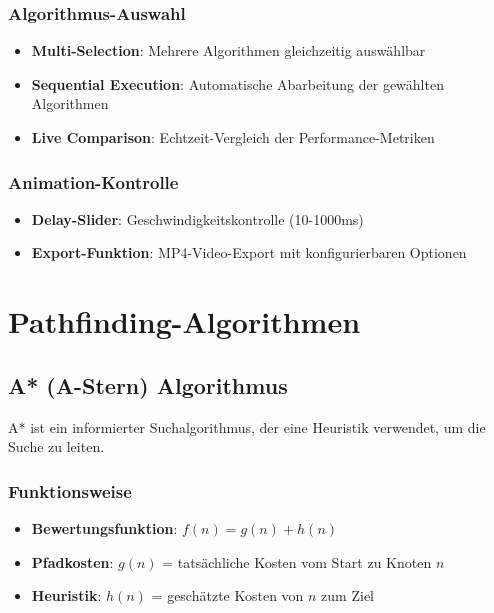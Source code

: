 \documentclass[12pt,a4paper]{article}
\begin{document}
\subsubsection{Algorithmus-Auswahl}
\begin{itemize}
    \item \textbf{Multi-Selection}: Mehrere Algorithmen gleichzeitig auswählbar
    \item \textbf{Sequential Execution}: Automatische Abarbeitung der gewählten Algorithmen
    \item \textbf{Live Comparison}: Echtzeit-Vergleich der Performance-Metriken
\end{itemize}

\subsubsection{Animation-Kontrolle}
\begin{itemize}
    \item \textbf{Delay-Slider}: Geschwindigkeitskontrolle (10-1000ms)
    \item \textbf{Export-Funktion}: MP4-Video-Export mit konfigurierbaren Optionen
\end{itemize}

\section{Pathfinding-Algorithmen}

\subsection{A* (A-Stern) Algorithmus}

A* ist ein informierter Suchalgorithmus, der eine Heuristik verwendet, um die Suche zu leiten.

\subsubsection{Funktionsweise}
\begin{itemize}
    \item \textbf{Bewertungsfunktion}: $f(n) = g(n) + h(n)$
    \item \textbf{Pfadkosten}: $g(n)$ = tatsächliche Kosten vom Start zu Knoten $n$
    \item \textbf{Heuristik}: $h(n)$ = geschätzte Kosten von $n$ zum Ziel
\end{itemize}
\end{document}

